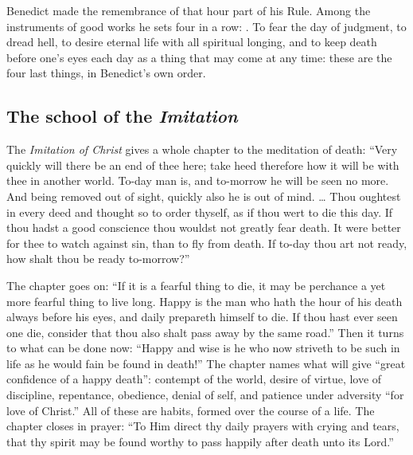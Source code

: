 Benedict made the remembrance of that hour part of his Rule. Among the instruments of good works he sets four in a row: . To fear the day of judgment, to dread hell, to desire eternal life with all spiritual longing, and to keep death before one's eyes each day as a thing that may come at any time: these are the four last things, in Benedict's own order.

\subsection{The school of the \emph{Imitation}}

The \emph{Imitation of Christ} gives a whole chapter to the meditation of death: ``Very quickly will there be an end of thee here; take heed therefore how it will be with thee in another world. To-day man is, and to-morrow he will be seen no more. And being removed out of sight, quickly also he is out of mind. \ldots{} Thou oughtest in every deed and thought so to order thyself, as if thou wert to die this day. If thou hadst a good conscience thou wouldst not greatly fear death. It were better for thee to watch against sin, than to fly from death. If to-day thou art not ready, how shalt thou be ready to-morrow?''

The chapter goes on: ``If it is a fearful thing to die, it may be perchance a yet more fearful thing to live long. Happy is the man who hath the hour of his death always before his eyes, and daily prepareth himself to die. If thou hast ever seen one die, consider that thou also shalt pass away by the same road.'' Then it turns to what can be done now: ``Happy and wise is he who now striveth to be such in life as he would fain be found in death!'' The chapter names what will give ``great confidence of a happy death'': contempt of the world, desire of virtue, love of discipline, repentance, obedience, denial of self, and patience under adversity ``for love of Christ.'' All of these are habits, formed over the course of a life. The chapter closes in prayer: ``To Him direct thy daily prayers with crying and tears, that thy spirit may be found worthy to pass happily after death unto its Lord.''

